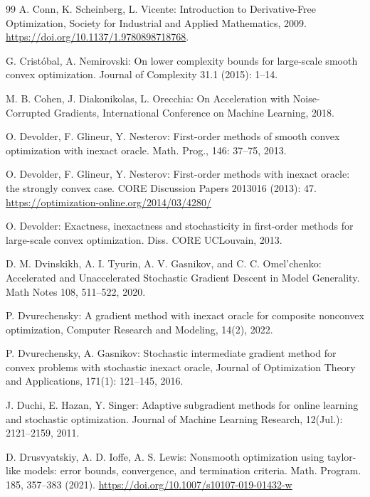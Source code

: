 \documentclass[11pt]{amsart}
\theoremstyle{definition}
\numberwithin{equation}{section}
\begin{document}
\begin{thebibliography}{99}
A. Conn, K. Scheinberg, L. Vicente: Introduction to Derivative-Free Optimization, Society for Industrial and Applied Mathematics, 2009. \url{https://doi.org/10.1137/1.9780898718768}.

G. Cristóbal, A. Nemirovski: On lower complexity bounds for large-scale smooth convex optimization. Journal of Complexity 31.1 (2015): 1--14.

M. B. Cohen, J. Diakonikolas, L. Orecchia: On Acceleration with Noise-Corrupted Gradients, International Conference on Machine Learning, 2018.

O. Devolder, F. Glineur, Y. Nesterov: First-order methods of smooth convex optimization with inexact oracle. Math. Prog., 146: 37–75, 2013.

O. Devolder, F. Glineur, Y. Nesterov: First-order methods with inexact oracle: the strongly convex case. CORE Discussion Papers 2013016 (2013): 47. \url{https://optimization-online.org/2014/03/4280/}

O. Devolder: Exactness, inexactness and stochasticity in first-order methods for large-scale convex optimization. Diss. CORE UCLouvain, 2013.

D. M. Dvinskikh, A. I. Tyurin, A. V. Gasnikov, and C. C. Omel’chenko: Accelerated and Unaccelerated Stochastic Gradient Descent in Model Generality. Math Notes 108, 511--522, 2020.

P. Dvurechensky: A gradient method with inexact oracle for composite nonconvex optimization, Computer Research and Modeling, 14(2), 2022.

P. Dvurechensky, A. Gasnikov: Stochastic intermediate gradient method for convex problems with stochastic inexact oracle, Journal of Optimization Theory and Applications, 171(1): 121–145, 2016.

J. Duchi, E. Hazan, Y. Singer: Adaptive subgradient methods for online learning and stochastic optimization. Journal of Machine Learning Research, 12(Jul.): 2121--2159, 2011.

D. Drusvyatskiy, A. D. Ioffe, A. S. Lewis: Nonsmooth optimization using taylor-like models: error bounds, convergence, and termination criteria. Math. Program. 185, 357–383 (2021). \url{https://doi.org/10.1007/s10107-019-01432-w} 


\end{thebibliography}
\end{document}
